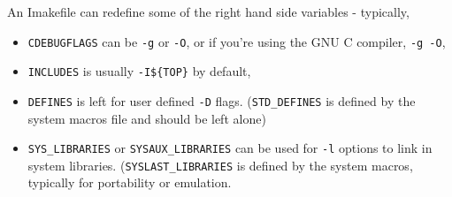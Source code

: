 An Imakefile can redefine some of the right hand side variables -
typically, 
\begin{itemize}
\item {\tt CDEBUGFLAGS} can be {\tt -g} or {\tt -O}, or if you're
using the GNU C compiler, {\tt -g -O}, 

\item{\tt INCLUDES} is usually {\tt -I\$\{TOP\}} by default, 

\item {\tt DEFINES} is left for user defined {\tt-D} flags. 
({\tt STD\_DEFINES} is defined by the system macros file
and should be left alone) 

\item {\tt SYS\_LIBRARIES} or {\tt SYSAUX\_LIBRARIES} can be used for
{\tt -l} options to link in system libraries. ({\tt SYSLAST\_LIBRARIES}
is defined by the system macros, typically for portability or
emulation.

\end{itemize}

